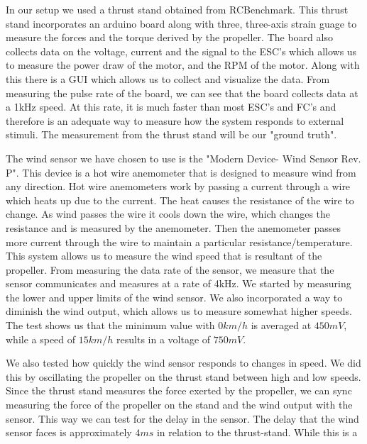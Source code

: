 \documentclass[twocolumn]{article}
\begin{document}
In our setup we used a thrust stand obtained from RCBenchmark. This thrust stand incorporates an arduino board along with three, three-axis strain guage to measure the forces and the torque derived by the propeller. The board also collects data on the voltage, current and the signal to the ESC's which allows us to measure the power draw of the motor, and the RPM of the motor. Along with this there is a GUI which allows us to collect and visualize the data. From measuring the pulse rate of the board, we can see that the board collects data at a 1kHz speed. At this rate, it is much faster than most ESC's and FC's and therefore is an adequate way to measure how the system responds to external stimuli. The measurement from the thrust stand will be our "ground truth".

The wind sensor we have chosen to use is the "Modern Device- Wind Sensor Rev. P". This device is a hot wire anemometer that is designed to measure wind from any direction. Hot wire anemometers work by passing a current through a wire which heats up due to the current. The heat causes the resistance of the wire to change. As wind passes the wire it cools down the wire, which changes the resistance and is measured by the anemometer. Then the anemometer passes more current through the wire to maintain a particular resistance/temperature. This system allows us to measure the wind speed that is resultant of the propeller. From measuring the data rate of the sensor, we measure that the sensor communicates and measures at a rate of 4kHz. We started by measuring the lower and upper limits of the wind sensor. We also incorporated a way to diminish the wind output, which allows us to measure somewhat higher speeds. The test shows us that the minimum value with $0 km/h$ is averaged at $450 mV$, while a speed of $15 km/h$ results in a voltage of $750 mV$.


We also tested how quickly the wind sensor responds to changes in speed. We did this by oscillating the propeller on the thrust stand between high and low speeds. Since the thrust stand measures the force exerted by the propeller, we can sync measuring the force of the propeller on the stand and the wind output with the sensor. This way we can test for the delay in the sensor. The delay that the wind sensor faces is approximately $4ms$ in relation to the thrust-stand. While this is a 
\end{document}
